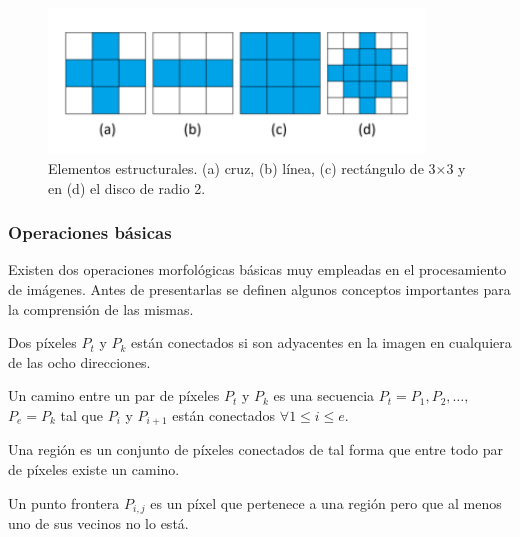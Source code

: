 \begin{figure}[ht]
	\centering
	\includegraphics[width=10cm]{./Graphics/kernel.png}
	\caption{Elementos estructurales. (a) cruz, (b) línea, (c) rectángulo de 3$\times$3 y en (d) el disco de radio 2.}
	\label{fig:kernel}
\end{figure}

\subsubsection{Operaciones básicas}

Existen dos operaciones morfológicas básicas  muy empleadas en el procesamiento de imágenes. Antes de presentarlas se definen algunos conceptos importantes para la comprensión de las mismas.

\begin{definition}
	Dos píxeles $P_t$ y $P_k$ están conectados si son adyacentes en la imagen en cualquiera de las ocho direcciones.
\end{definition}

\begin{definition}
	Un camino entre un par de píxeles $P_t$ y $P_k$ es una secuencia $P_t = P_1, P_2, \ldots,$ $P_e = P_k$ tal que $P_i$ y $P_{i + 1}$ están conectados $\forall 1 \leq i \leq e$.
\end{definition}

\begin{definition}
	Una región es un conjunto de píxeles conectados de tal forma que entre todo par de píxeles existe un camino.
\end{definition}

\begin{definition}
	Un punto frontera $P_{i, j}$ es un píxel que pertenece a una región pero que al menos uno de sus vecinos no lo está.
\end{definition}

